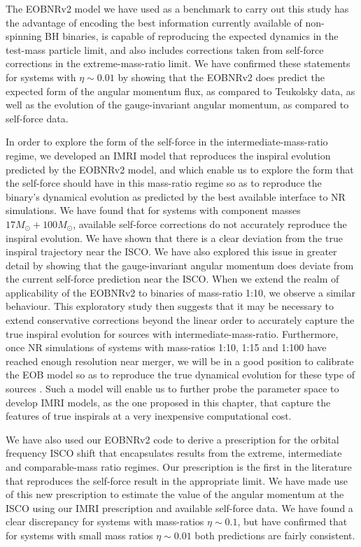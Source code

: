  The EOBNRv2 model we have used as a benchmark to carry out this study has the advantage of encoding the best information currently available of non-spinning BH binaries, is capable of reproducing the expected dynamics in the test-mass particle limit, and also includes corrections taken from self-force corrections in the extreme-mass-ratio limit. We have confirmed these statements for systems with  \(\eta\sim 0.01\) by showing  that the EOBNRv2 does predict the expected form of the angular momentum flux, as compared to Teukolsky data, as well as the evolution  of the gauge-invariant angular momentum, as compared to self-force data. 
 
In order to explore the form of the self-force in the intermediate-mass-ratio regime, we developed an IMRI model that reproduces the inspiral evolution predicted by the EOBNRv2 model, and which enable us to explore the form that the self-force should have in this mass-ratio regime so as to reproduce the binary's dynamical evolution as predicted by the best available interface to NR simulations. We have found that for systems with component masses  \(17M_{\odot} + 100M_{\odot}\), available self-force corrections do not accurately reproduce the inspiral evolution. We have shown that there is a clear deviation from the true inspiral trajectory near the ISCO. We have also explored this issue in greater detail by showing that the gauge-invariant angular momentum does deviate from the current self-force prediction near the ISCO. When we extend the realm of applicability of the EOBNRv2 to binaries of mass-ratio 1:10, we observe a similar behaviour.  This exploratory study then suggests that it may be necessary to 
extend conservative corrections beyond the linear order to accurately capture the true inspiral evolution for sources with intermediate-mass-ratio. Furthermore, once NR simulations of systems with mass-ratios 1:10, 1:15 and 1:100 have reached enough resolution near merger, we will be in a good position to calibrate the EOB model so as to reproduce the true dynamical evolution for these type of sources \cite{carlos, carlosI,carlosII}. Such a model will enable us to further probe the parameter space to develop IMRI models, as the one proposed in this chapter, that capture the features of true inspirals at a very inexpensive computational cost. 

We have also used our EOBNRv2 code to derive a prescription for the orbital frequency ISCO shift that encapsulates results from the extreme, intermediate and comparable-mass ratio regimes. Our prescription is the first in the literature that reproduces the self-force result in the appropriate limit.   We have made use of this new prescription to estimate the value of the angular momentum at the ISCO using our IMRI prescription and available self-force data. We have found a clear discrepancy for systems with mass-ratios \(\eta \sim 0.1\), but have confirmed that for systems with small mass ratios \(\eta\sim 0.01\) both predictions are fairly consistent. 

